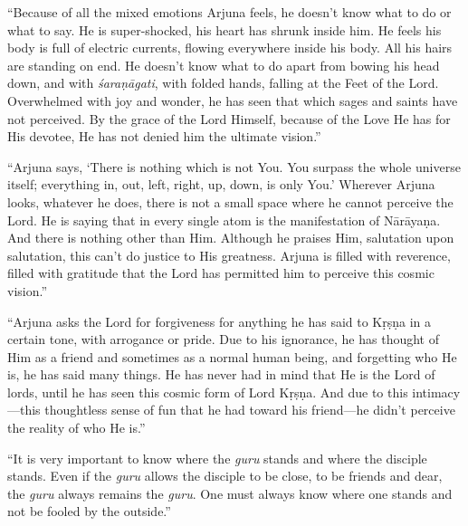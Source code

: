 \enquote{Because of all the mixed emotions Arjuna feels, he doesn’t know what to do or what to say. He is super-shocked, his heart has shrunk inside him. He feels his body is full of electric currents, flowing everywhere inside his body. All his hairs are standing on end. He doesn’t know what to do apart from bowing his head down, and with \textit{śaraṇāgati}, with folded hands, falling at the Feet of the Lord. Overwhelmed with joy and wonder, he has seen that which sages and saints have not perceived. By the grace of the Lord Himself, because of the Love He has for His devotee, He has not denied him the ultimate vision.}

\enquote{Arjuna says, \enquote{There is nothing which is not You. You surpass the whole universe itself; everything in, out, left, right, up, down, is only You.} Wherever Arjuna looks, whatever he does, there is not a small space where he cannot perceive the Lord. He is saying that in every single atom is the manifestation of Nārāyaṇa. And there is nothing other than Him. Although he praises Him, salutation upon salutation, this can’t do justice to His greatness. Arjuna is filled with reverence, filled with gratitude that the Lord has permitted him to perceive this cosmic vision.}

\enquote{Arjuna asks the Lord for forgiveness for anything he has said to Kṛṣṇa in a certain tone, with arrogance or pride. Due to his ignorance, he has thought of Him as a friend and sometimes as a normal human being, and forgetting who He is, he has said many things. He has never had in mind that He is the Lord of lords, until he has seen this cosmic form of Lord Kṛṣṇa. And due to this intimacy---this thoughtless sense of fun that he had toward his friend---he didn’t perceive the reality of who He is.}

\enquote{It is very important to know where the \textit{guru} stands and where the disciple stands. Even if the \textit{guru} allows the disciple to be close, to be friends and dear, the \textit{guru} always remains the \textit{guru}. One must always know where one stands and not be fooled by the outside.}

